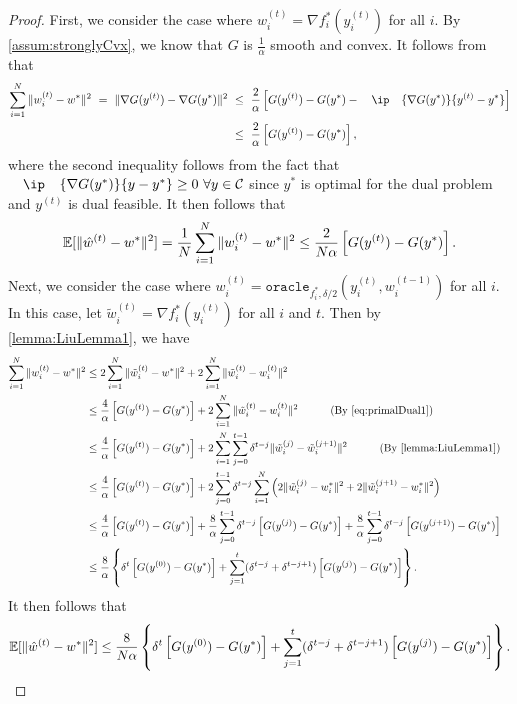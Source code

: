 \begin{proof}
    First, we consider the case where $w_i^{(t)} = \nabla f_i^*(y_i^{(t)})$ for all $i$. By \autoref{assum:stronglyCvx}, we know that $G$ is $\frac{1}{\alpha}$ smooth and convex. It follows from \citealp[Theorem~2.1.5]{cvxopt_lecture} that 
    \begin{align}
        \sum_{i=1}^N \|w_i^{(t)} - w^*\|^2 ~=~ \| \nabla G( y^{(t)} ) - \nabla G(y^*) \|^2
        &~\leq~ \frac{2}{\alpha} \left[G(y^{(t)}) - G(y^*) -  \ip{\nabla G(y^*)}{y^{(t)} - y^*}\right] \nonumber
        \\&~\leq~ \frac{2}{\alpha} \left[G(y^{(t)}) - G(y^*) \right],  \label{eq:primalDual1}
    \end{align}
    where the second inequality follows from the fact that $\ip{\nabla G(y^*)}{y - y^*} \geq 0~\forall y \in \Cscr $ since $y^*$ is optimal for the dual problem and $y^{(t)}$ is dual feasible. It then follows that 
    \[\mathbb{E}[\|\hat w^{(t)} - w^*\|^2] = \frac{1}{N}\sum_{i=1}^N \|w_i^{(t)} - w^*\|^2 \leq \frac{2}{N\alpha} \left[G(y^{(t)}) - G(y^*) \right].\]
    Next, we consider the case where $w_i^{(t)} = \texttt{oracle}_{f_i^*, \delta/2}(y^{(t)}_i, w_{i}^{(t-1)})$ for all $i$. In this case, let $\tilde w_i^{(t)} = \nabla f_i^*(y_i^{(t)})$ for all $i$ and $t$. Then by \autoref{lemma:LiuLemma1}, we have 
    \begin{align*}
        \sum_{i=1}^N \|w_i^{(t)} - w^*\|^2 &\leq 2\sum_{i=1}^N \|\tilde w_i^{(t)} - w^*\|^2 + 2\sum_{i=1}^N \|\tilde w_i^{(t)} - w_i^{(t)}\|^2
        \\&\leq \frac{4}{\alpha}\left[G(y^{(t)}) - G(y^*) \right] + 2\sum_{i=1}^N \|\tilde w_i^{(t)} - w_i^{(t)}\|^2 \qquad \text{(By \autoref{eq:primalDual1})}
        \\&\leq \frac{4}{\alpha}\left[G(y^{(t)}) - G(y^*) \right] + 2 \sum_{i=1}^N \sum_{j=0}^{t-1}\delta^{t-j}\|\tilde w_i^{(j)} - \tilde w_i^{(j+1)}\|^2 \qquad \text{(By \autoref{lemma:LiuLemma1})}
        \\&\leq \frac{4}{\alpha}\left[G(y^{(t)}) - G(y^*) \right] + 2  \sum_{j=0}^{t-1}\delta^{t-j} \sum_{i=1}^N \left( 2\|\tilde w_i^{(j)} -  w_i^{*}\|^2 + 2 \|\tilde w_i^{(j+1)} -  w_i^{*}\|^2 \right)
        \\&\leq \frac{4}{\alpha}\left[G(y^{(t)}) - G(y^*) \right] + \frac{8}{\alpha} \sum_{j=0}^{t-1} \delta^{t-j}\left[G(y^{(j)}) - G(y^*) \right] + \frac{8}{\alpha} \sum_{j=0}^{t-1} \delta^{t-j}\left[G(y^{(j+1)}) - G(y^*) \right]
        \\&\leq \frac{8}{\alpha} \left\{ \delta^t\left[G(y^{(0)}) - G(y^*)\right] + \sum_{j=1}^t (\delta^{t-j} + \delta^{t-j+1})\left[G(y^{(j)}) - G(y^*)\right]\right\}.
    \end{align*}
     It then follows that 
    \[\mathbb{E}[\|\hat w^{(t)} - w^*\|^2] \leq \frac{8}{N\alpha} \left\{ \delta^t\left[G(y^{(0)}) - G(y^*)\right] + \sum_{j=1}^t (\delta^{t-j} + \delta^{t-j+1})\left[G(y^{(j)}) - G(y^*)\right]\right\}.\]
\end{proof}

